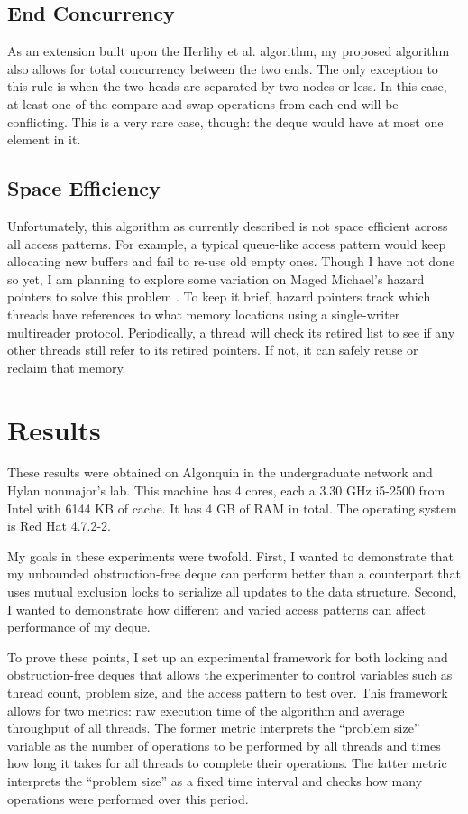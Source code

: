 \documentclass[11pt, letterpaper]{article}
\begin{document}
        \subsection{End Concurrency}
            As an extension built upon the Herlihy et al. algorithm, my proposed algorithm also allows for total concurrency between the two ends. The only exception to this rule is when the two heads are separated by two nodes or less. In this case, at least one of the compare-and-swap operations from each end will be conflicting. This is a very rare case, though: the deque would have at most one element in it.

        \subsection{Space Efficiency}
            Unfortunately, this algorithm as currently described is not space efficient across all access patterns. For example, a typical queue-like access pattern would keep allocating new buffers and fail to re-use old empty ones. Though I have not done so yet, I am planning to explore some variation on Maged Michael's hazard pointers to solve this problem \cite{hazard}. To keep it brief, hazard pointers track which threads have references to what memory locations using a single-writer multireader protocol. Periodically, a thread will check its retired list to see if any other threads still refer to its retired pointers. If not, it can safely reuse or reclaim that memory.

    \section{Results}
        These results were obtained on Algonquin in the undergraduate network and Hylan nonmajor's lab. This machine has 4 cores, each a 3.30 GHz i5-2500 from Intel with 6144 KB of cache. It has 4 GB of RAM in total. The operating system is Red Hat 4.7.2-2.

        My goals in these experiments were twofold. First, I wanted to demonstrate that my unbounded obstruction-free deque can perform better than a counterpart that uses mutual exclusion locks to serialize all updates to the data structure. Second, I wanted to demonstrate how different and varied access patterns can affect performance of my deque.

        To prove these points, I set up an experimental framework for both locking and obstruction-free deques that allows the experimenter to control variables such as thread count, problem size, and the access pattern to test over. This framework allows for two metrics: raw execution time of the algorithm and average throughput of all threads. The former metric interprets the ``problem size'' variable as the number of operations to be performed by all threads and times how long it takes for all threads to complete their operations. The latter metric interprets the ``problem size'' as a fixed time interval and checks how many operations were performed over this period.
\end{document}
